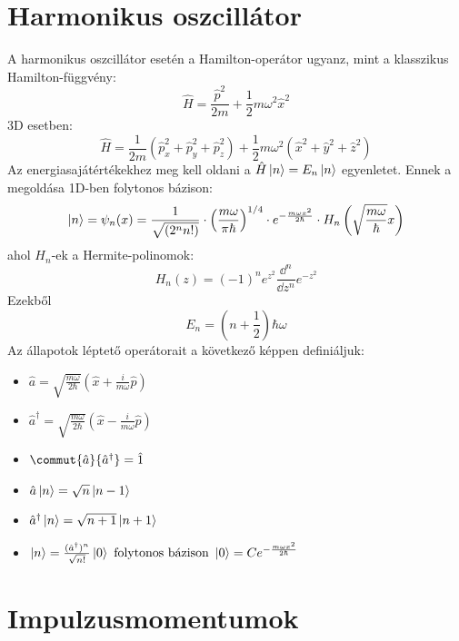 \section{Harmonikus oszcillátor}
A harmonikus oszcillátor esetén a Hamilton-operátor ugyanz, mint a klasszikus Hamilton-függvény:
\begin{equation}
  \hat H = \frac{\hat p^2}{2m} + \frac{1}{2}m\omega^2 \hat x^2  
\end{equation}
3D esetben:
\begin{equation}
    \hat H = \frac{1}{2m}(\hat p_x^2+\hat p_y^2+\hat p_z^2) + \frac{1}{2}m\omega^2 (\hat x^2 + \hat y^2 + \hat z^2)  
\end{equation}
Az energiasajátértékekhez meg kell oldani a $\hat H \ket n = E_n \ket n$ egyenletet. Ennek a megoldása 1D-ben
folytonos bázison:
\begin{equation}
    \ket n = \psi_n(x) = \frac{1}{\sqrt{(2^n n!)}} \cdot \left (\frac{m\omega}{\pi\hbar}\right)^{1/4}
    \cdot e^{-\frac{m\omega x^2}{2\hbar}} \cdot H_n\left(\sqrt\frac{m\omega}{\hbar}x\right)    
\end{equation}
ahol $H_n$-ek a Hermite-polinomok:
\begin{equation}
    H_n(z) = (-1)^n e^z^2 \frac{\dd^n}{\dd z^n}e^{-z^2}
\end{equation}
Ezekből 
\begin{equation}
    E_n = \left(n + \frac{1}{2}\right)   \hbar \omega 
\end{equation}
\pagebreak
Az állapotok léptető operátorait a következő képpen definiáljuk:
\begin{itemize}
    \item $
        \hat a = \sqrt{\frac{m\omega}{2\hbar}}\left(\hat x + \frac{i}{m\omega}\hat p\right)
    $
    \item $
       \hat a^{\dag} = \sqrt{\frac{m\omega}{2\hbar}}\left(\hat x - \frac{i}{m\omega}\hat p\right)
    $
    \item $
        \commut{\hat a}{\hat a^{\dag}} = \hat 1
    $
    \item $
        \hat a \ket n = \sqrt n \ket{n-1}
    $
    \item $
        \hat a^{\dag} \ket n = \sqrt{n+1}\ket{n+1}
    $
    \item $
        \ket n = \frac{(\hat a^{\dag})^n}{\sqrt{n!}}\ket 0 
        \textrm{  folytonos bázison  } \ket 0 = Ce^{-\frac{m\omega x^2}{2\hbar}}
    $
\end{itemize}


\section{Impulzusmomentumok}
